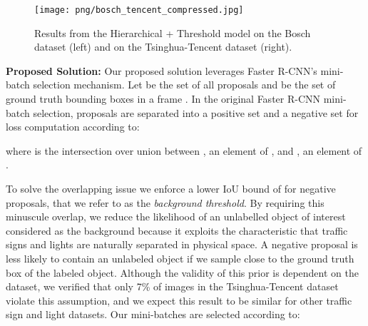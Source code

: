 \documentclass[10pt, conference, compsocconf]{IEEEtran}
\begin{document}
\begin{figure*}[t!]
    \begin{center}
    \texttt{[image: png/bosch\_tencent\_compressed.jpg]}
    \end{center}
    \caption{Results from the Hierarchical + Threshold model on the Bosch dataset (left) and on the Tsinghua-Tencent dataset (right).}
    \label{sample_detection_bosch_tencent}
\end{figure*}

\begin{table*}[t]
\centering
{}
\caption{Comparison of the performance of our baselines and novel architectures on the Bosch and Tsinghua-Tencent datasets.}
\label{performance_table}
\end{table*}

\noindent\textbf{Proposed Solution:} Our proposed solution leverages Faster R-CNN's mini-batch selection mechanism. Let  be the set of all proposals and  be the set of ground truth bounding boxes in a frame . In the original Faster R-CNN mini-batch selection, proposals are separated into a positive set  and a negative set  for loss computation according to:

where  is the intersection over union between , an element of , and , an element of . 

To solve the overlapping issue we enforce a lower IoU bound of  for negative proposals, that we refer to as the \textit{background threshold}. By requiring this minuscule overlap, we reduce the likelihood of an unlabelled object of interest considered as the background because it exploits the characteristic that traffic signs and lights are naturally separated in physical space. A negative proposal is less likely to contain an unlabeled object if we sample close to the ground truth box of the labeled object. Although the validity of this prior is dependent on the dataset, we verified that only 7\% of images in the Tsinghua-Tencent dataset violate this assumption, and we expect this result to be similar for other traffic sign and light datasets. Our mini-batches are selected according to:
\end{document}
